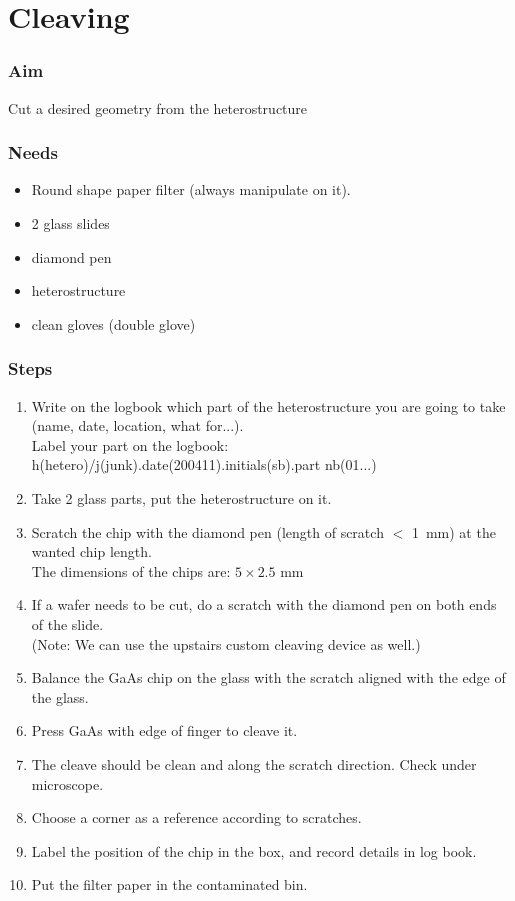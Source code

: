 \section{Cleaving}
\subsubsection{Aim}
Cut a desired geometry from the heterostructure
\subsubsection{Needs}
\begin{itemize}[noitemsep]
\item Round shape paper filter (always manipulate on it).
\item 2 glass slides
\item diamond pen
\item heterostructure
\item clean gloves (double glove)
\end{itemize}
\subsubsection{Steps}
\begin{enumerate}
\item Write on the logbook which part of the heterostructure you are going to take (name, date, location, what for...).\\
Label your part on the logbook:\\
h(hetero)/j(junk).date(200411).initials(sb).part nb(01...)
\item Take 2 glass parts, put the heterostructure on it.
\item Scratch the chip with the diamond pen (length of scratch $<$ \SI{1}{\milli\meter}) at the wanted chip length.\\
The dimensions of the chips are:
$5 \times 2.5$ \si{\milli\meter}
\item If a wafer needs to be cut, do a scratch with the diamond pen on both ends of the slide.\\
(Note: We can use the upstairs custom cleaving device as well.)
\item Balance the GaAs chip on the glass with the scratch aligned with the edge of the glass.
\item Press GaAs with edge of finger to cleave it.
\item The cleave should be clean and along the scratch direction. Check under microscope.
\item Choose a corner as a reference according to scratches.
\item Label the position of the chip in the box, and record details in log book.
\item Put the filter paper in the contaminated bin.
\end{enumerate}

\newpage

